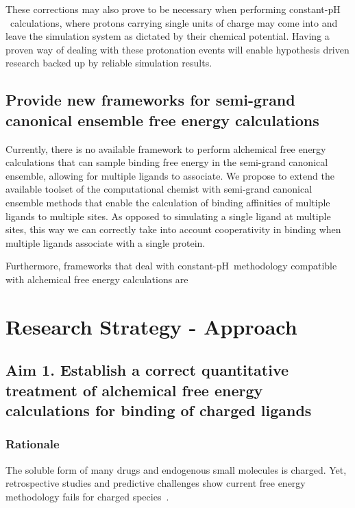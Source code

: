 \documentclass[10pt,final]{article}
\newif\ifinstr
\newcommand{\instr}[1]{\ifdraft{\ifinstr {\color{cyan}\emph{#1}} \fi}{}}
\newcommand{\pH}{p$\mathrm{H}$\ }
\begin{document}
These corrections may also prove to be necessary when performing constant-\pH calculations, where protons carrying single units of charge may come into and leave the simulation system as dictated by their chemical potential. Having a proven way of dealing with these protonation events will enable hypothesis driven research backed up by reliable simulation results.


\subsection*{Provide new frameworks for semi-grand canonical ensemble free energy calculations}
Currently, there is no available framework to perform alchemical free energy calculations that can sample binding free energy in the semi-grand canonical ensemble, allowing for multiple ligands to associate. We propose to extend the available toolset of the computational chemist with semi-grand canonical ensemble methods that enable the calculation of binding affinities of multiple ligands to multiple sites. As opposed to simulating a single ligand at multiple sites, this way we can correctly take into account cooperativity in binding when multiple ligands associate with a single protein.

Furthermore, frameworks that deal with constant-\pH methodology compatible with alchemical free energy calculations are 


\section*{Research Strategy - Approach}
\instr{Approach: More specific background information. Describe in detail the experimental design and research methods to be used. Technical hurdles to be overcome should be mentioned. Alternative approaches should be given for experiments that may not be feasible. Discussion of expected or possible results and their interpretation. Best format for each specific aim: a) rationale, b) methods, c) expected results, d) alternatives. Theory aims should follow a similar structure where possible.}


\subsection*{Aim 1. Establish a correct quantitative treatment of alchemical free energy calculations for binding of charged ligands}
\subsubsection*{Rationale}
The soluble form of many drugs and endogenous small molecules is charged. Yet, retrospective studies and predictive challenges show current free energy methodology fails for charged species~\cite{Rocklin2013b,Muddana2014a}.
\end{document}
